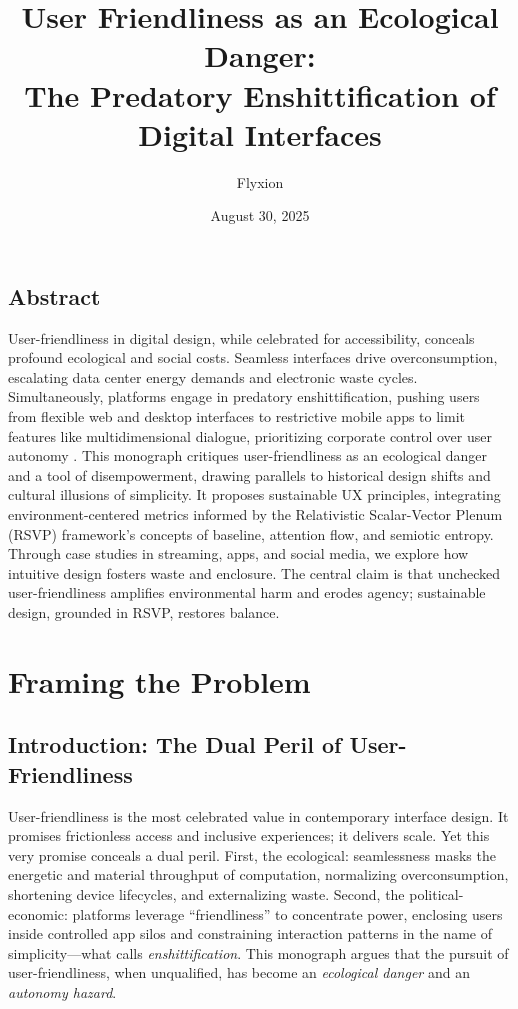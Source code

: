 \documentclass[openany]{book}
\title{User Friendliness as an Ecological Danger:\\ The Predatory Enshittification of Digital Interfaces}
\author{Flyxion}
\date{August 30, 2025}
\begin{document}
\maketitle
{}

\chapter*{Abstract}
User-friendliness in digital design, while celebrated for accessibility, conceals profound ecological and social costs. Seamless interfaces drive overconsumption, escalating data center energy demands and electronic waste cycles. Simultaneously, platforms engage in predatory enshittification, pushing users from flexible web and desktop interfaces to restrictive mobile apps to limit features like multidimensional dialogue, prioritizing corporate control over user autonomy \citep{doctorow2022}. This monograph critiques user-friendliness as an ecological danger and a tool of disempowerment, drawing parallels to historical design shifts and cultural illusions of simplicity. It proposes sustainable UX principles, integrating environment-centered metrics informed by the Relativistic Scalar-Vector Plenum (RSVP) framework's concepts of baseline, attention flow, and semiotic entropy. Through case studies in streaming, apps, and social media, we explore how intuitive design fosters waste and enclosure. The central claim is that unchecked user-friendliness amplifies environmental harm and erodes agency; sustainable design, grounded in RSVP, restores balance.

\clearpage
{}
\tableofcontents
\clearpage
{}

\part{Framing the Problem}

\chapter{Introduction: The Dual Peril of User-Friendliness}
\label{ch:intro}

User-friendliness is the most celebrated value in contemporary interface design. It promises frictionless access and inclusive experiences; it delivers scale. Yet this very promise conceals a dual peril. First, the ecological: seamlessness masks the energetic and material throughput of computation, normalizing overconsumption, shortening device lifecycles, and externalizing waste. Second, the political-economic: platforms leverage \enquote{friendliness} to concentrate power, enclosing users inside controlled app silos and constraining interaction patterns in the name of simplicity—what \citet{doctorow2022} calls \emph{enshittification}. This monograph argues that the pursuit of user-friendliness, when unqualified, has become an \emph{ecological danger} and an \emph{autonomy hazard}.
\end{document}

